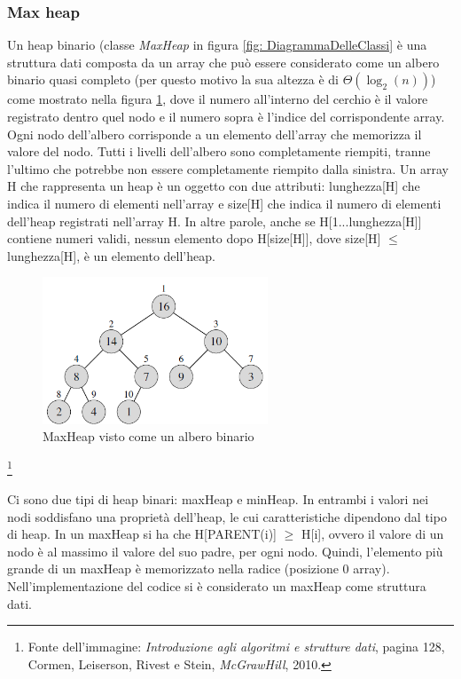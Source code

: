 \documentclass{article}
\begin{document}
\subsubsection{Max heap}
Un heap binario (classe \textit{MaxHeap} in figura \ref{fig: DiagrammaDelleClassi} è una struttura dati composta da un array che può essere considerato come un albero binario quasi completo (per questo motivo la sua altezza è di $\Theta(\log_2(n))$) come mostrato nella figura \ref{fig: Heap1}, dove il numero all'interno del cerchio è il valore registrato dentro quel nodo e il numero sopra è l'indice del corrispondente array. Ogni nodo dell'albero corrisponde a un elemento dell'array che memorizza il valore del nodo. Tutti i livelli dell'albero sono completamente riempiti, tranne l'ultimo che potrebbe non essere completamente riempito dalla sinistra. Un array H che rappresenta un heap è un oggetto con due attributi: lunghezza[H] che indica il numero di elementi nell'array e size[H] che indica il numero di elementi dell'heap registrati nell'array H. In altre parole, anche se H[1...lunghezza[H]] contiene numeri validi, nessun elemento dopo H[size[H]], dove size[H] \(\leq\) lunghezza[H], è un elemento dell'heap.

\begin{figure}[H]
    \includegraphics[width=0.6\textwidth]{Images/Heap1.png}
    \centering
    \caption{MaxHeap visto come un albero binario}
    \label{fig: Heap1}
\end{figure}

\footnote{Fonte dell'immagine: \textit{Introduzione agli algoritmi e strutture dati}, pagina 128, Cormen, Leiserson, Rivest e Stein, \emph{McGrawHill}, 2010.}

Ci sono due tipi di heap binari: maxHeap e minHeap. In entrambi i valori nei nodi soddisfano una proprietà dell'heap, le cui caratteristiche dipendono dal tipo di heap. In un maxHeap si ha che H[PARENT(i)] \(\geq\) H[i], ovvero il valore di un nodo è al massimo il valore del suo padre, per ogni nodo. Quindi, l'elemento più grande di un maxHeap è memorizzato nella radice (posizione 0 array). Nell'implementazione del codice si è considerato un maxHeap come struttura dati.
\end{document}
